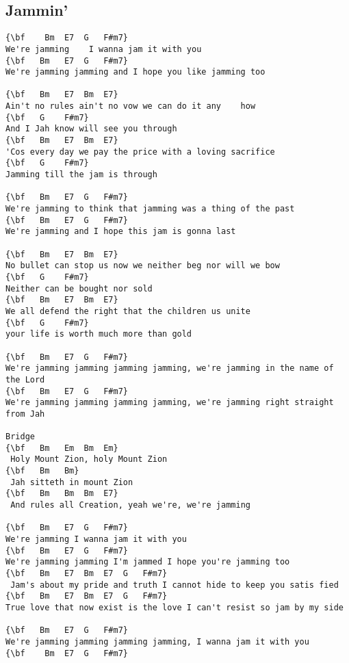 \documentclass[a4paper]{article}
\begin{document}
\subsection{Jammin'}
\begin{Verbatim}[commandchars=\\\{\}]
{\bf  	Bm	E7	G	F#m7}
We're jamming    I wanna jam it with you   
{\bf   Bm	E7	G	F#m7}
We're jamming jamming and I hope you like jamming too   

{\bf   Bm	E7	Bm	E7}
Ain't no rules ain't no vow we can do it any	how  
{\bf   G	F#m7}
And I Jah know will see you through 
{\bf   Bm	E7	Bm	E7}
'Cos every day we pay the price with a loving sacrifice         
{\bf   G	F#m7}
Jamming till the jam is through  

{\bf   Bm	E7	G	F#m7}
We're jamming to think that jamming was a thing of the past
{\bf   Bm	E7	G	F#m7}
We're jamming and I hope this jam is gonna last

{\bf   Bm	E7	Bm	E7}
No bullet can stop us now we neither beg nor will we bow  
{\bf   G	F#m7}
Neither can be bought nor sold    
{\bf   Bm	E7	Bm	E7}
We all defend the right that the children us unite             
{\bf   G	F#m7}
your life is worth much more than gold

{\bf   Bm	E7	G	F#m7}
We're jamming jamming jamming jamming, we're jamming in the name of the Lord
{\bf   Bm	E7	G	F#m7}
We're jamming jamming jamming jamming, we're jamming right straight from Jah

Bridge
{\bf   Bm	Em	Bm	Em}
 Holy Mount Zion, holy Mount Zion
{\bf   Bm	Bm}
 Jah sitteth in mount Zion
{\bf   Bm	Bm	Bm	E7}
 And rules all Creation, yeah we're, we're jamming   

{\bf   Bm	E7	G	F#m7}
We're jamming I wanna jam it with you 
{\bf   Bm	E7	G	F#m7}
We're jamming jamming I'm jammed I hope you're jamming too 
{\bf   Bm	E7	Bm	E7	G	F#m7}
 Jam's about my pride and truth I cannot hide to keep you satis	fied    
{\bf   Bm	E7	Bm	E7	G	F#m7}
True love that now exist is the love I can't resist so jam by my side    

{\bf   Bm	E7	G	F#m7}
We're jamming jamming jamming jamming, I wanna jam it with you
{\bf   	Bm	E7	G	F#m7}

\end{Verbatim}
\newpage
\end{document}
